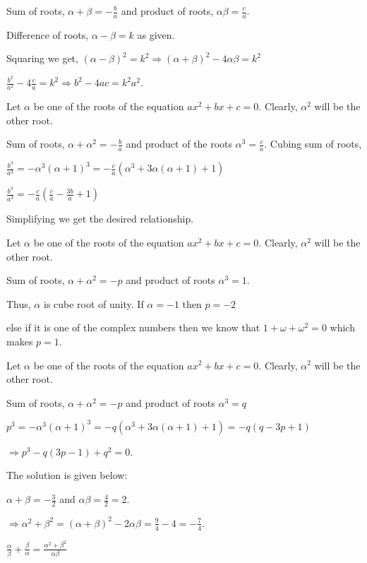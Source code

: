   Sum of roots, $\alpha + \beta = -\frac{b}{a}$ and product of roots, $\alpha\beta = \frac{c}{a}$.

  Difference of roots, $\alpha - \beta = k$ as given.

  Squaring we get, $(\alpha - \beta)^2 = k^2 \Rightarrow (\alpha + \beta)^2 - 4\alpha\beta = k^2$

  $\frac{b^2}{a^2} - 4\frac{c}{a} = k^2 \Rightarrow b^2 - 4ac = k^2a^2$.
\item Let $\alpha$ be one of the roots of the equation $ax^2 + bx + c = 0$. Clearly, $\alpha^2$ will be the other root.

  Sum of roots, $\alpha + \alpha^2 = -\frac{b}{a}$ and product of the roots $\alpha^3 = \frac{c}{a}$. Cubing sum of roots,

  $\frac{b^3}{a^3} = -\alpha^3(\alpha + 1)^3 = -\frac{c}{a}(\alpha^3 + 3\alpha(\alpha + 1) + 1)$

  $\frac{b^3}{a^3} = -\frac{c}{a}\left(\frac{c}{a} - \frac{3b}{a} + 1\right)$

  Simplifying we get the desired relationship.
\item Let $\alpha$ be one of the roots of the equation $ax^2 + bx + c = 0$. Clearly, $\alpha^2$ will be the other root.

  Sum of roots, $\alpha + \alpha^2 = -p$ and product of roots $\alpha^3 = 1$.

  Thus, $\alpha$ is cube root of unity. If $\alpha = -1$ then $p = -2$

  else if it is one of the complex numbers then we know that $1 + \omega + \omega^2 = 0$ which makes $p =
  1$.
\item Let $\alpha$ be one of the roots of the equation $ax^2 + bx + c = 0$. Clearly, $\alpha^2$ will be the other root.

  Sum of roots, $\alpha + \alpha^2 = -p$ and product of roots $\alpha^3 = q$

  $p^3 = -\alpha^3(\alpha + 1)^3 = -q(\alpha^3 + 3\alpha(\alpha + 1) + 1) = -q(q - 3p + 1)$

  $\Rightarrow p^3 - q(3p - 1) + q^2 = 0$.
\item The solution is given below:
  \startitemize[i]
  \item $\alpha + \beta = -\frac{3}{2}$ and $\alpha\beta = \frac{4}{2} = 2$.

    $\Rightarrow \alpha^2 + \beta^2 = (\alpha + \beta)^2 - 2\alpha\beta = \frac{9}{4} - 4 = -\frac{7}{4}$.
  \item $\frac{\alpha}{\beta} + \frac{\beta}{\alpha} = \frac{\alpha^2 + \beta^2}{\alpha\beta}$

